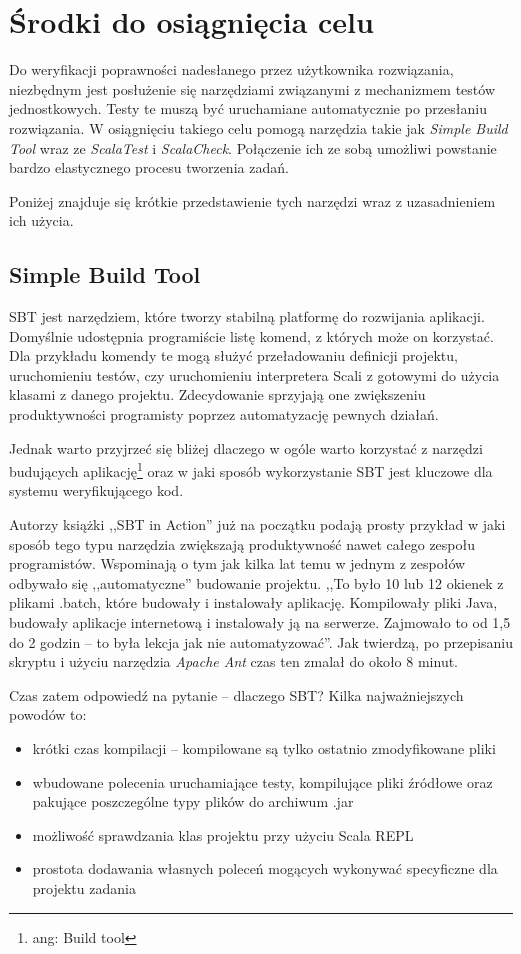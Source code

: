 \documentclass[brudnopis]{xmgr}
\begin{document}
\section{Środki do osiągnięcia celu}

Do weryfikacji poprawności nadesłanego przez użytkownika rozwiązania, niezbędnym jest posłużenie się narzędziami związanymi z mechanizmem testów jednostkowych. Testy te muszą być uruchamiane automatycznie po przesłaniu rozwiązania. W osiągnięciu takiego celu pomogą narzędzia takie jak \textit{Simple Build Tool} wraz ze \textit{ScalaTest} i \textit{ScalaCheck}. Połączenie ich ze sobą umożliwi powstanie bardzo elastycznego procesu tworzenia zadań. 

Poniżej znajduje się krótkie przedstawienie tych narzędzi wraz z uzasadnieniem ich użycia. 

\subsection{Simple Build Tool}

SBT jest narzędziem, które tworzy stabilną platformę do rozwijania aplikacji. Domyślnie udostępnia programiście listę komend, z których może on korzystać. Dla przykładu komendy te mogą służyć przeładowaniu definicji projektu, uruchomieniu testów, czy uruchomieniu interpretera Scali z gotowymi do użycia klasami z danego projektu. Zdecydowanie sprzyjają one zwiększeniu produktywności programisty poprzez automatyzację pewnych działań.

Jednak warto przyjrzeć się bliżej dlaczego w ogóle warto korzystać z narzędzi budujących aplikację\footnote{ang: Build tool} oraz w jaki sposób wykorzystanie SBT jest kluczowe dla systemu weryfikującego kod. 

Autorzy książki ,,SBT in Action'' już na początku podają prosty przykład w jaki sposób tego typu narzędzia zwiększają produktywność nawet całego zespołu programistów. Wspominają o tym jak kilka lat temu w jednym z zespołów odbywało się ,,automatyczne'' budowanie projektu. ,,To było 10 lub 12 okienek z plikami .batch, które budowały i instalowały aplikację. Kompilowały pliki Java, budowały aplikacje internetową i instalowały ją na serwerze. Zajmowało to od 1,5 do 2 godzin -- to była lekcja jak nie automatyzować''.\cite[s.1]{Suereth:2014:SIA} Jak twierdzą, po przepisaniu skryptu i użyciu narzędzia \emph{Apache Ant} czas ten zmalał do około 8 minut.

Czas zatem odpowiedź na pytanie -- dlaczego SBT? Kilka najważniejszych powodów to:
\begin{itemize}
\item krótki czas kompilacji -- kompilowane są tylko ostatnio zmodyfikowane pliki
\item wbudowane polecenia uruchamiające testy, kompilujące pliki źródłowe oraz pakujące poszczególne typy plików do archiwum .jar
\item możliwość sprawdzania klas projektu przy użyciu Scala REPL
\item prostota dodawania własnych poleceń mogących wykonywać specyficzne dla projektu zadania   
\end{itemize}
\end{document}

